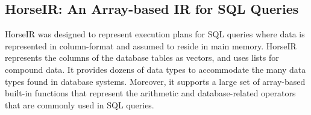 \subsection{HorseIR: An Array-based IR for SQL Queries}

HorseIR \OldPaper was designed to represent execution plans for SQL queries
where data is represented in column-format and assumed to reside in
main memory. HorseIR represents the columns of the database tables as vectors,
and uses lists for compound data. It provides dozens of data types to
accommodate the many data types found in database systems. 
Moreover, it supports a large set of array-based built-in functions that
represent the arithmetic and database-related operators that are commonly used
in SQL queries.

